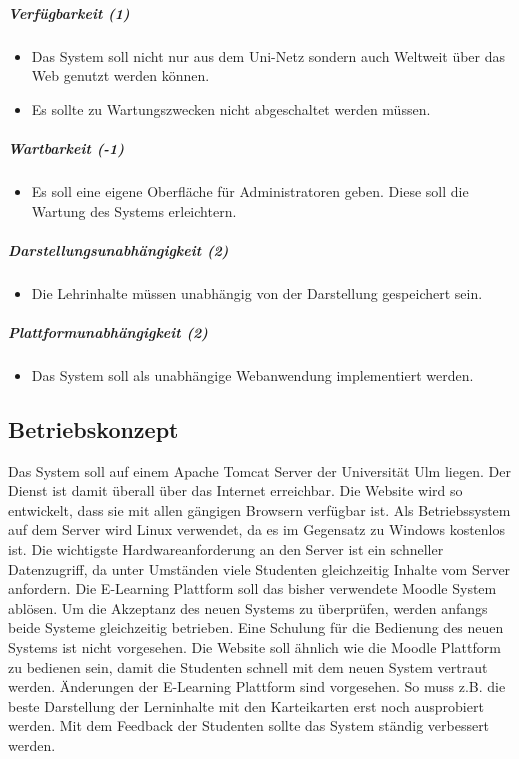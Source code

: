\documentclass[12pt,a4paper]{article}
\begin{document}
{\begin{itemize}
\end{itemize}
\subparagraph{Verfügbarkeit (1)}
\begin{itemize}
	\item Das System soll nicht nur aus dem Uni-Netz sondern auch Weltweit über das Web genutzt werden können.
	\item Es sollte zu Wartungszwecken nicht abgeschaltet werden müssen.
\end{itemize}
\subparagraph{Wartbarkeit (-1)}
\begin{itemize}
	\item Es soll eine eigene Oberfläche für Administratoren geben. Diese soll  die Wartung des Systems erleichtern.
\end{itemize}
\subparagraph{Darstellungsunabhängigkeit (2)}
\begin{itemize}
	\item Die Lehrinhalte müssen unabhängig von der Darstellung gespeichert sein.
\end{itemize}
\subparagraph{Plattformunabhängigkeit (2)}
\begin{itemize}
	\item Das System soll als unabhängige Webanwendung implementiert werden.
\end{itemize}

\subsection{Betriebskonzept}
Das System soll auf einem Apache Tomcat Server der Universität Ulm liegen. Der Dienst ist damit überall über das Internet erreichbar. Die Website wird so entwickelt, dass sie mit allen gängigen Browsern verfügbar ist. Als Betriebssystem auf dem Server wird Linux verwendet, da es im Gegensatz zu Windows kostenlos ist. Die wichtigste Hardwareanforderung an den Server ist ein schneller Datenzugriff, da unter Umständen viele Studenten gleichzeitig Inhalte vom Server anfordern. Die E-Learning Plattform soll das bisher verwendete Moodle System ablösen. Um die Akzeptanz des neuen Systems zu überprüfen, werden anfangs beide Systeme gleichzeitig betrieben. Eine Schulung für die Bedienung des neuen Systems ist nicht vorgesehen. Die Website soll ähnlich wie die Moodle Plattform zu bedienen sein, damit die Studenten schnell mit dem neuen System vertraut werden. Änderungen der E-Learning Plattform sind vorgesehen. So muss z.B. die beste Darstellung der Lerninhalte mit den Karteikarten erst noch ausprobiert werden. Mit dem Feedback der Studenten sollte das System ständig verbessert werden.

}
\end{document}
